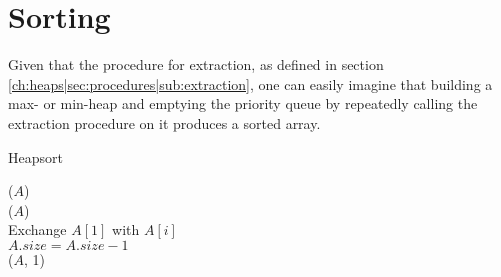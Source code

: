 \newpage
\section{Sorting}
Given that the procedure for extraction, as defined in section
\ref{ch:heaps|sec:procedures|sub:extraction}, one can easily imagine that
building a max- or min-heap and emptying the priority queue by repeatedly
calling the extraction procedure on it produces a sorted array.

\begin{algorithm}[H]
	\caption{Heapsort}
	\label{alg:heapsort}
	
	
	
	
	
	\BlankLine
	\HeapSort($A$) \\
	\Begin
	{
		\BuildMaxHeap($A$) \\
		{
			Exchange $A[1]$ with $A[i]$ \\
			$A.size = A.size - 1$ \\
			\MaxHeapify($A$, 1)
		}
	}
\end{algorithm}

